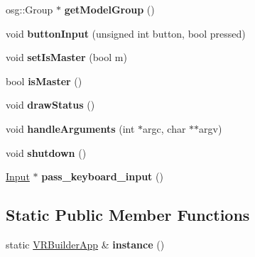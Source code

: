\begin{DoxyCompactItemize}
\item 
\hypertarget{class_v_r_builder_app_ac74ca164d67bddf4c61f462e743f625d}{
osg::Group $\ast$ {\bfseries getModelGroup} ()}
\label{class_v_r_builder_app_ac74ca164d67bddf4c61f462e743f625d}

\item 
\hypertarget{class_v_r_builder_app_acbf1bb61528ecd10e3effe088ba8f58e}{
void {\bfseries buttonInput} (unsigned int button, bool pressed)}
\label{class_v_r_builder_app_acbf1bb61528ecd10e3effe088ba8f58e}

\item 
\hypertarget{class_v_r_builder_app_a955bed81a32f3c4f5bca2103cb3b6061}{
void {\bfseries setIsMaster} (bool m)}
\label{class_v_r_builder_app_a955bed81a32f3c4f5bca2103cb3b6061}

\item 
\hypertarget{class_v_r_builder_app_af7c072246ba51ae157ec2d66dc96dffd}{
bool {\bfseries isMaster} ()}
\label{class_v_r_builder_app_af7c072246ba51ae157ec2d66dc96dffd}

\item 
\hypertarget{class_v_r_builder_app_af685370f62068646d2442c2bc4c0e049}{
void {\bfseries drawStatus} ()}
\label{class_v_r_builder_app_af685370f62068646d2442c2bc4c0e049}

\item 
\hypertarget{class_v_r_builder_app_a71bbc105d07a73d67316011084211b60}{
void {\bfseries handleArguments} (int $\ast$argc, char $\ast$$\ast$argv)}
\label{class_v_r_builder_app_a71bbc105d07a73d67316011084211b60}

\item 
\hypertarget{class_v_r_builder_app_aaabc841cdd3869c5bdf7bec9e11cb8a2}{
void {\bfseries shutdown} ()}
\label{class_v_r_builder_app_aaabc841cdd3869c5bdf7bec9e11cb8a2}

\item 
\hypertarget{class_v_r_builder_app_a1cb0bbd4e2fcd193c0cf54d8200e383a}{
\hyperlink{class_input}{Input} $\ast$ {\bfseries pass\_\-keyboard\_\-input} ()}
\label{class_v_r_builder_app_a1cb0bbd4e2fcd193c0cf54d8200e383a}

\end{DoxyCompactItemize}
\subsection*{Static Public Member Functions}
\begin{DoxyCompactItemize}
\item 
\hypertarget{class_v_r_builder_app_aaae6ee013256eb3faea430df6e4d74a0}{
static \hyperlink{class_v_r_builder_app}{VRBuilderApp} \& {\bfseries instance} ()}
\label{class_v_r_builder_app_aaae6ee013256eb3faea430df6e4d74a0}

\end{DoxyCompactItemize}
